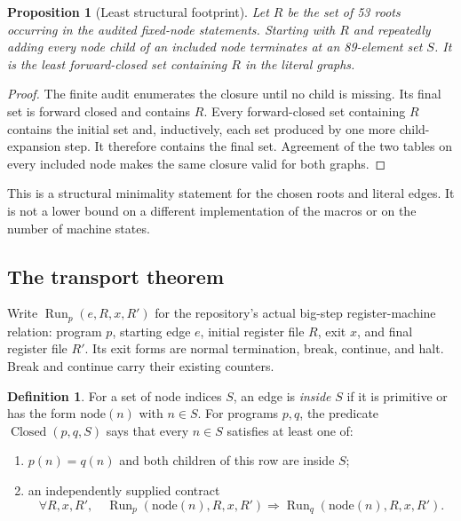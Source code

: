 \documentclass[11pt,letterpaper]{article}
\newtheorem{proposition}[theorem]{Proposition}
\theoremstyle{definition}\newtheorem{definition}[theorem]{Definition}
\theoremstyle{remark}\newtheorem{remark}[theorem]{Remark}
\newcommand{\Run}{\operatorname{Run}}
\newcommand{\Closed}{\operatorname{Closed}}
\begin{document}
\begin{proposition}[Least structural footprint]
Let $R$ be the set of 53 roots occurring in the audited fixed-node statements. Starting with $R$ and repeatedly adding every node child of an included node terminates at an 89-element set $S$. It is the least forward-closed set containing $R$ in the literal graphs.
\end{proposition}
\begin{proof}
The finite audit enumerates the closure until no child is missing. Its final set is forward closed and contains $R$. Every forward-closed set containing $R$ contains the initial set and, inductively, each set produced by one more child-expansion step. It therefore contains the final set. Agreement of the two tables on every included node makes the same closure valid for both graphs.
\end{proof}

This is a structural minimality statement for the chosen roots and literal edges. It is not a lower bound on a different implementation of the macros or on the number of machine states.

\subsection{The transport theorem}

Write $\Run_p(e,R,x,R')$ for the repository's actual big-step register-machine relation: program $p$, starting edge $e$, initial register file $R$, exit $x$, and final register file $R'$. Its exit forms are normal termination, break, continue, and halt. Break and continue carry their existing counters.

\begin{definition}
For a set of node indices $S$, an edge is \emph{inside} $S$ if it is primitive or has the form $\mathrm{node}(n)$ with $n\in S$.
For programs $p,q$, the predicate $\Closed(p,q,S)$ says that every $n\in S$ satisfies at least one of:
\begin{enumerate}
\item $p(n)=q(n)$ and both children of this row are inside $S$;
\item an independently supplied contract
\[
\forall R,x,R',\quad
\Run_p(\mathrm{node}(n),R,x,R')\Rightarrow
\Run_q(\mathrm{node}(n),R,x,R').
\]
\end{enumerate}
\end{definition}
\end{document}
